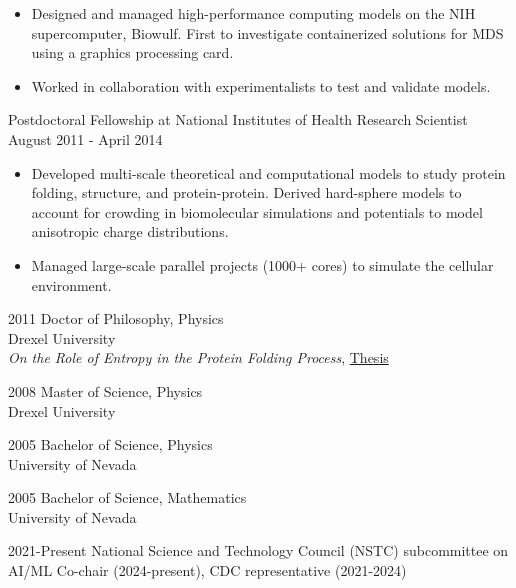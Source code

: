 \documentclass[]{scrartcl}
\begin{document}
\begin{cleanCV}
{\begin{itemize}
  \item Designed and managed high-performance computing models on the NIH supercomputer, Biowulf. First to investigate containerized solutions for MDS using a graphics processing card.

  \item Worked in collaboration with experimentalists to test and validate models. 

  \end{itemize}
}


\WorkExperience
{}
{Postdoctoral Fellowship at National Institutes of Health}
{\newline Research Scientist}
{
  \newline August 2011 - April 2014
}
{
  \begin{itemize}
  \item Developed multi-scale theoretical and computational models to study protein folding, structure, and protein-protein. Derived hard-sphere models to account for crowding in biomolecular simulations and potentials to model anisotropic charge distributions.
  \item Managed large-scale parallel projects (1000+ cores) to simulate the cellular environment.
  \end{itemize}
}



\WorkExperience
{2011}
{Doctor of Philosophy, Physics}
{
\\Drexel University
\\\emph{On the Role of Entropy in the Protein Folding Process}, \href{https://idea.library.drexel.edu/islandora/object/idea:3488}{Thesis}
}

\WorkExperience
{2008}
{Master of Science, Physics}
{\\Drexel University}

\WorkExperience
{2005}
{Bachelor of Science, Physics}
{\\University of Nevada}

\WorkExperience
{2005}
{Bachelor of Science, Mathematics}
{\\University of Nevada}


\WorkExperienceX
{2021-Present}
{National Science and Technology Council (NSTC) subcommittee on AI/ML}
{Co-chair (2024-present), CDC representative (2021-2024)}


\end{cleanCV}
\end{document}
